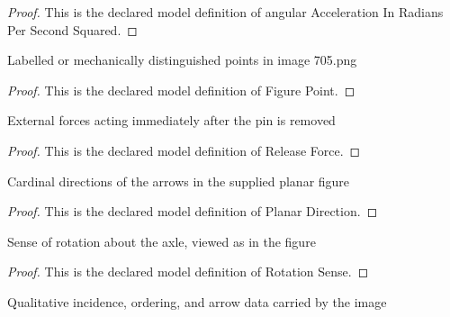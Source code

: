 \begin{proof}
  This is the declared model definition of angular Acceleration In Radians Per Second Squared.
\end{proof}
\begin{definition}
  \label{def:physics:phyx-mini-0705:phyxminiproblems-problemphyxmini0705-figurepoint}
  Labelled or mechanically distinguished points in image 705.png
\end{definition}
\begin{proof}
  This is the declared model definition of Figure Point.
\end{proof}
\begin{definition}
  \label{def:physics:phyx-mini-0705:phyxminiproblems-problemphyxmini0705-releaseforce}
  External forces acting immediately after the pin is removed
\end{definition}
\begin{proof}
  This is the declared model definition of Release Force.
\end{proof}
\begin{definition}
  \label{def:physics:phyx-mini-0705:phyxminiproblems-problemphyxmini0705-planardirection}
  Cardinal directions of the arrows in the supplied planar figure
\end{definition}
\begin{proof}
  This is the declared model definition of Planar Direction.
\end{proof}
\begin{definition}
  \label{def:physics:phyx-mini-0705:phyxminiproblems-problemphyxmini0705-rotationsense}
  Sense of rotation about the axle, viewed as in the figure
\end{definition}
\begin{proof}
  This is the declared model definition of Rotation Sense.
\end{proof}
\begin{definition}
  \label{def:physics:phyx-mini-0705:phyxminiproblems-problemphyxmini0705-primarydiskfigure}
  Qualitative incidence, ordering, and arrow data carried by the image
\end{definition}
